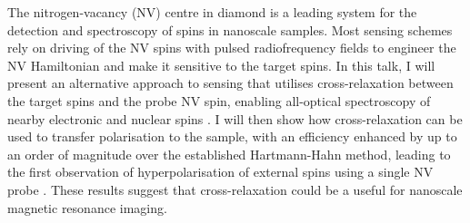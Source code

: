The nitrogen-vacancy (NV) centre in diamond is a leading system for the detection and spectroscopy of spins in nanoscale samples. Most sensing schemes rely on driving of the NV spins with pulsed radiofrequency fields to engineer the NV Hamiltonian and make it sensitive to the target spins. In this talk, I will present an alternative approach to sensing that utilises cross-relaxation between the target spins and the probe NV spin, enabling all-optical spectroscopy of nearby electronic and nuclear spins \cite{Hall_2016,Wood_2016,Wood_2017}. I will then show how cross-relaxation can be used to transfer polarisation to the sample, with an efficiency enhanced by up to an order of magnitude over the established Hartmann-Hahn method, leading to the first observation of hyperpolarisation of external spins using a single NV probe \cite{1708.05906v2}. These results suggest that cross-relaxation could be a useful for nanoscale magnetic resonance imaging.